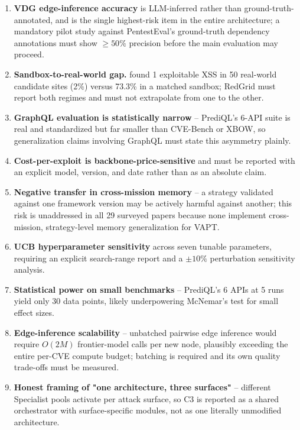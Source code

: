 \begin{enumerate}
    \item \textbf{VDG edge-inference accuracy} is LLM-inferred rather than ground-truth-annotated, and is the single highest-risk item in the entire architecture; a mandatory pilot study against PentestEval's ground-truth dependency annotations must show $\geq 50\%$ precision before the main evaluation may proceed.
    \item \textbf{Sandbox-to-real-world gap.} \citet{fang2024hackwebsites} found 1 exploitable XSS in 50 real-world candidate sites (2\%) versus 73.3\% in a matched sandbox; RedGrid must report both regimes and must not extrapolate from one to the other.
    \item \textbf{GraphQL evaluation is statistically narrow} -- PrediQL's 6-API suite is real and standardized but far smaller than CVE-Bench or XBOW, so generalization claims involving GraphQL must state this asymmetry plainly.
    \item \textbf{Cost-per-exploit is backbone-price-sensitive} and must be reported with an explicit model, version, and date rather than as an absolute claim.
    \item \textbf{Negative transfer in cross-mission memory} -- a strategy validated against one framework version may be actively harmful against another; this risk is unaddressed in all 29 surveyed papers because none implement cross-mission, strategy-level memory generalization for VAPT.
    \item \textbf{UCB hyperparameter sensitivity} across seven tunable parameters, requiring an explicit search-range report and a $\pm 10\%$ perturbation sensitivity analysis.
    \item \textbf{Statistical power on small benchmarks} -- PrediQL's 6 APIs at 5 runs yield only 30 data points, likely underpowering McNemar's test for small effect sizes.
    \item \textbf{Edge-inference scalability} -- unbatched pairwise edge inference would require $O(2M)$ frontier-model calls per new node, plausibly exceeding the entire per-CVE compute budget; batching is required and its own quality trade-offs must be measured.
    \item \textbf{Honest framing of "one architecture, three surfaces"} -- different Specialist pools activate per attack surface, so C3 is reported as a shared orchestrator with surface-specific modules, not as one literally unmodified architecture.
\end{enumerate}

